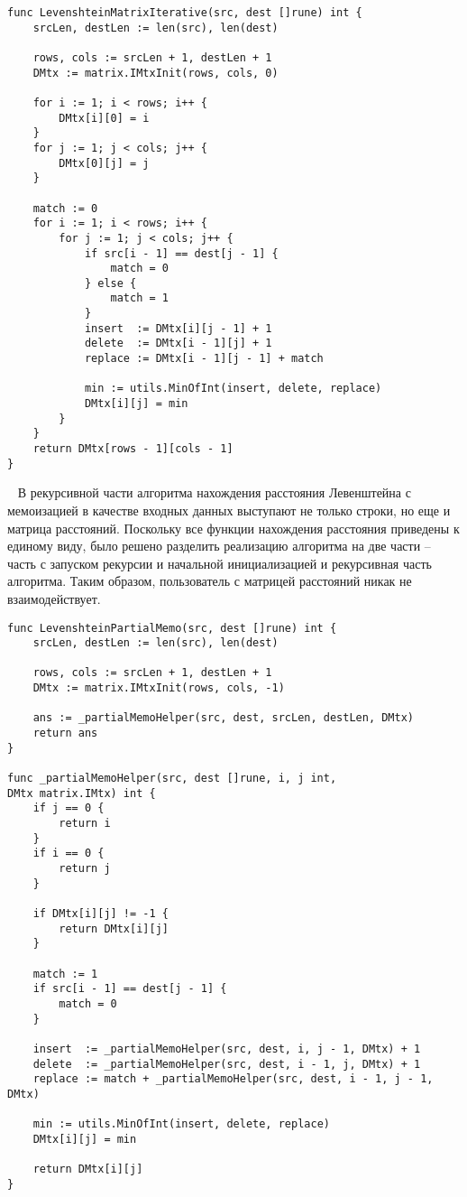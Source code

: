 \begin{lstlisting}[label=matrix-iter,caption=Программный код нахождения расстояния Левенштейна итеративно]
func LevenshteinMatrixIterative(src, dest []rune) int {
	srcLen, destLen := len(src), len(dest)
	
	rows, cols := srcLen + 1, destLen + 1
	DMtx := matrix.IMtxInit(rows, cols, 0)
	
	for i := 1; i < rows; i++ {
		DMtx[i][0] = i
	}
	for j := 1; j < cols; j++ {
		DMtx[0][j] = j
	}
	
	match := 0
	for i := 1; i < rows; i++ {
		for j := 1; j < cols; j++ {
			if src[i - 1] == dest[j - 1] {
				match = 0
			} else {
				match = 1
			}
			insert  := DMtx[i][j - 1] + 1
			delete  := DMtx[i - 1][j] + 1
			replace := DMtx[i - 1][j - 1] + match
			
			min := utils.MinOfInt(insert, delete, replace)
			DMtx[i][j] = min
		}
	}
	return DMtx[rows - 1][cols - 1]
}
\end{lstlisting}
~\newline
В рекурсивной части алгоритма нахождения расстояния Левенштейна с мемоизацией в качестве входных данных выступают не только строки, но еще и матрица расстояний. Поскольку все функции нахождения расстояния приведены к единому виду, было решено разделить реализацию алгоритма на две части -- часть с запуском рекурсии и начальной инициализацией и рекурсивная часть алгоритма. Таким образом, пользователь с матрицей расстояний никак не взаимодействует.
\newline
\begin{lstlisting}[label=memo-helper,caption=Программный код нахождения расстояния Левенштейна с мемоизацией]
func LevenshteinPartialMemo(src, dest []rune) int {
	srcLen, destLen := len(src), len(dest)
	
	rows, cols := srcLen + 1, destLen + 1
	DMtx := matrix.IMtxInit(rows, cols, -1)
	
	ans := _partialMemoHelper(src, dest, srcLen, destLen, DMtx)
	return ans
}

func _partialMemoHelper(src, dest []rune, i, j int, 
DMtx matrix.IMtx) int {
	if j == 0 {
		return i
	}
	if i == 0 {
		return j
	}
	
	if DMtx[i][j] != -1 {
		return DMtx[i][j]
	}
	
	match := 1
	if src[i - 1] == dest[j - 1] {
		match = 0
	}
	
	insert  := _partialMemoHelper(src, dest, i, j - 1, DMtx) + 1
	delete  := _partialMemoHelper(src, dest, i - 1, j, DMtx) + 1
	replace := match + _partialMemoHelper(src, dest, i - 1, j - 1, DMtx)
	
	min := utils.MinOfInt(insert, delete, replace)
	DMtx[i][j] = min
	
	return DMtx[i][j]
}
\end{lstlisting}
